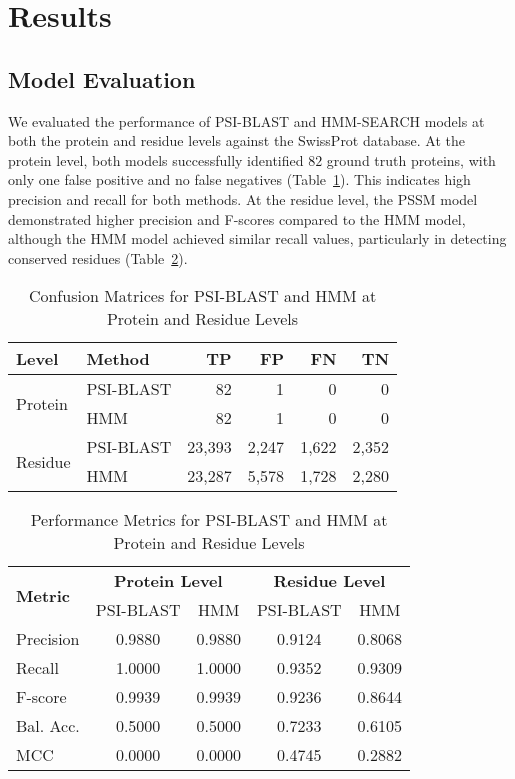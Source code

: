 
\section{Results}

\subsection{Model Evaluation}
We evaluated the performance of PSI-BLAST and HMM-SEARCH models at both the protein and residue levels against the SwissProt database. At the protein level, both models successfully identified $82$ ground truth proteins, with only one false positive and no false negatives (Table~\ref{tab:confusion}). This indicates high precision and recall for both methods. At the residue level, the PSSM model demonstrated higher precision and F-scores compared to the HMM model, although the HMM model achieved similar recall values, particularly in detecting conserved residues (Table~\ref{tab:metrics}).

\begin{table}[H]
    \centering
    \small
    \caption{Confusion Matrices for PSI-BLAST and HMM at Protein and Residue Levels}
    \label{tab:confusion}
    \begin{tabular}{llrrrr}
        \toprule
        \textbf{Level} & \textbf{Method} & \textbf{TP} & \textbf{FP} & \textbf{FN} & \textbf{TN} \\
        \midrule
        \multirow{2}{*}{Protein} 
        & PSI-BLAST & 82 & 1 & 0 & 0 \\
        & HMM & 82 & 1 & 0 & 0 \\
        \midrule
        \multirow{2}{*}{Residue} 
        & PSI-BLAST & 23,393 & 2,247 & 1,622 & 2,352 \\
        & HMM & 23,287 & 5,578 & 1,728 & 2,280 \\
        \bottomrule
    \end{tabular}
\end{table}

\begin{table}[H]
    \centering
    \small
    \caption{Performance Metrics for PSI-BLAST and HMM at Protein and Residue Levels}
    \label{tab:metrics}
    \begin{tabular}{lcccc}
        \toprule
        \multirow{2}{*}{\textbf{Metric}} & \multicolumn{2}{c}{\textbf{Protein Level}} & \multicolumn{2}{c}{\textbf{Residue Level}} \\
        \cmidrule(lr){2-3} \cmidrule(lr){4-5}
        & PSI-BLAST & HMM & PSI-BLAST & HMM \\
        \midrule
        Precision & 0.9880 & 0.9880 & 0.9124 & 0.8068 \\
        Recall & 1.0000 & 1.0000 & 0.9352 & 0.9309 \\
        F-score & 0.9939 & 0.9939 & 0.9236 & 0.8644 \\
        Bal. Acc. & 0.5000 & 0.5000 & 0.7233 & 0.6105 \\
        MCC & 0.0000 & 0.0000 & 0.4745 & 0.2882 \\
        \bottomrule
    \end{tabular}
\end{table}

